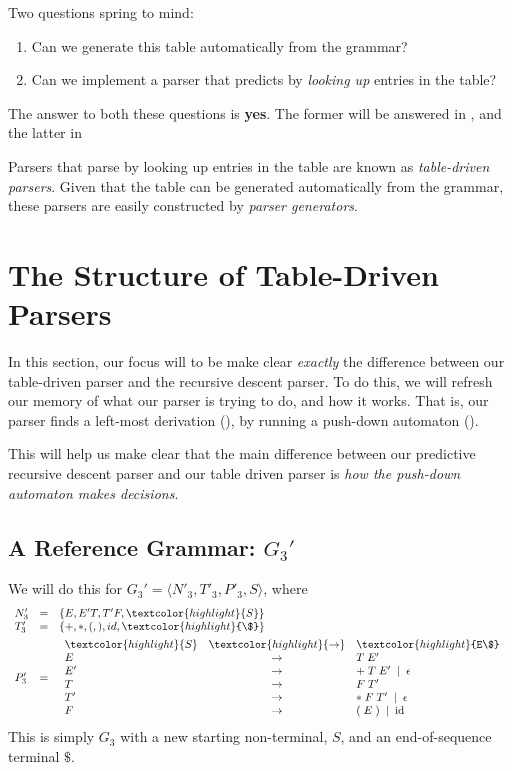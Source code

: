 Two questions spring to mind:
\begin{enumerate}
    \item Can we generate this table automatically from the grammar?
    \item Can we implement a parser that predicts by \textit{looking up} entries in the table?
\end{enumerate}

The answer to both these questions is \textbf{yes}. The former will be answered in , and the latter in 

Parsers that parse by looking up entries in the table are known as \textit{table-driven parsers}. Given that the table can be generated automatically from the grammar, these parsers are easily constructed by \textit{parser generators}. 

\section{The Structure of Table-Driven Parsers}
In this section, our focus will to be make clear \textit{exactly} the difference between our table-driven parser and the recursive descent parser. To do this, we will refresh our memory of what our parser is trying to do, and how it works. That is, our parser finds a left-most derivation (), by running a push-down automaton (). 

This will help us make clear that the main difference between our predictive recursive descent parser and our table driven parser is \textit{how the push-down automaton makes decisions}.

\subsection{A Reference Grammar: $G_3'$}\label{section:g3prime}
We will do this for $G_3' = \langle N'_3, T'_3, P'_3, S\rangle$, where
\[
\begin{array}{lcl}
N'_3 &=& \{ E,E'T,T'F,\textcolor{highlight}{S} \} \\
T'_3 &=& \{+,*,(,),id,\textcolor{highlight}{\$}\}\\[1ex]
P'_3 &=& \begin{array}{lcl}
  \textcolor{highlight}{S}  &\textcolor{highlight}{\to}& \textcolor{highlight}{E\$} \\
  E  &\to& T \;E' \\
  E' &\to& + \;T\; E' \;\mid\; \epsilon\\
  T  &\to& F\; T'\\
  T' &\to& * \;F\; T' \;\mid\; \epsilon\\
  F  &\to& (\;E\;) \;\mid\; \text{id}\\
\end{array}
\end{array}
\]
This is simply $G_3$ with a new starting non-terminal, $S$, and an end-of-sequence terminal $\$$. 

